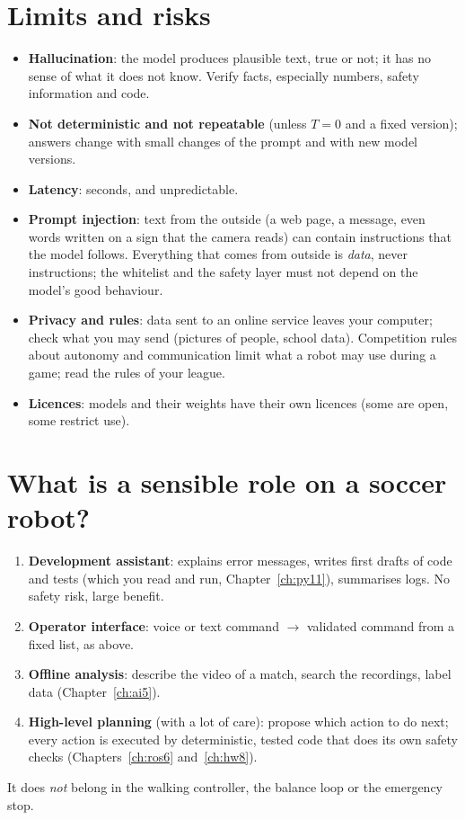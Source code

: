 \section*{Limits and risks}
\begin{itemize}[nosep]
\item \textbf{Hallucination}: the model produces plausible text, true or not; it has no sense of what it does not know. Verify facts, especially numbers, safety information and code.
\item \textbf{Not deterministic and not repeatable} (unless $T=0$ and a fixed version); answers change with small changes of the prompt and with new model versions.
\item \textbf{Latency}: seconds, and unpredictable.
\item \textbf{Prompt injection}: text from the outside (a web page, a message, even words written on a sign that the camera reads) can contain instructions that the model follows. Everything that comes from outside is \emph{data}, never instructions; the whitelist and the safety layer must not depend on the model's good behaviour.
\item \textbf{Privacy and rules}: data sent to an online service leaves your computer; check what you may send (pictures of people, school data). Competition rules about autonomy and communication limit what a robot may use during a game; read the rules of your league.
\item \textbf{Licences}: models and their weights have their own licences (some are open, some restrict use).
\end{itemize}

\section*{What is a sensible role on a soccer robot?}
\begin{enumerate}[nosep]
\item \textbf{Development assistant}: explains error messages, writes first drafts of code and tests (which you read and run, Chapter~\ref{ch:py11}), summarises logs. No safety risk, large benefit.
\item \textbf{Operator interface}: voice or text command $\rightarrow$ validated command from a fixed list, as above.
\item \textbf{Offline analysis}: describe the video of a match, search the recordings, label data (Chapter~\ref{ch:ai5}).
\item \textbf{High-level planning} (with a lot of care): propose which action to do next; every action is executed by deterministic, tested code that does its own safety checks (Chapters~\ref{ch:ros6} and~\ref{ch:hw8}).
\end{enumerate}
It does \emph{not} belong in the walking controller, the balance loop or the emergency stop.


